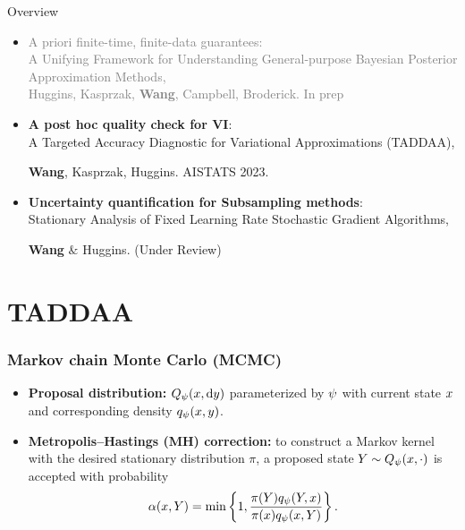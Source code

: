 \documentclass[10pt,xcolor=table]{beamer}
\begin{document}
\begin{frame}{Overview}
	\begin{itemize}
		\item \textcolor{gray}{A priori finite-time, finite-data guarantees:\\
		A Unifying Framework for Understanding General-purpose Bayesian Posterior Approximation Methods, \\
		Huggins, Kasprzak, \textbf{Wang}, Campbell, Broderick. In prep} \pause
		\item \textbf{A post hoc quality check for VI}: \\A Targeted Accuracy Diagnostic for Variational Approximations (TADDAA), 
		
		\textbf{Wang}, Kasprzak, Huggins. AISTATS 2023.
		\item \textbf{Uncertainty quantification for Subsampling methods}:\\
		Stationary Analysis of Fixed Learning Rate Stochastic Gradient Algorithms, 
		
		\textbf{Wang} $\&$ Huggins. (Under Review)
	\end{itemize}
\end{frame}

\section{TADDAA}

\begin{frame}
  \frametitle{Markov chain Monte Carlo (MCMC) }
  \begin{itemize}
  \item \textbf{Proposal distribution:} $Q_{\psi}(x, {\mathrm{d}{y}})$ parameterized by $\psi$ with current state $x$ and corresponding density $q_{\psi}(x, y)$.
  \item \textbf{Metropolis--Hastings (MH) correction:} to construct a Markov kernel with the desired stationary distribution $\pi$, a proposed state 
$Y \sim Q_{\psi}(x, \cdot)$ 
is accepted with probability 
\[ \label{eq:MH-accept}
\alpha(x, Y) 
= \min \left\{1, \frac{\pi(Y) q_{\psi}(Y, x)}{\pi(x) q_{\psi}(x, Y)}\right\}. 
\]
  \end{itemize}
\end{frame}
\end{document}
